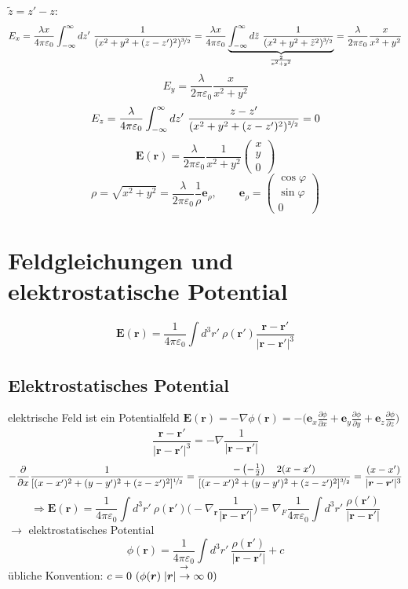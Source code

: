 \documentclass[titlepage,11pt,a4paper,ngerman]{report}
\newcommand{\prt}[2]{\frac{\partial #1}{\partial #2}}
\newcommand{\kq}{\frac{1}{4\pi\epsilon_0}}
\newcommand{\intt}[2]{\int_{#1}^{#2}}
\renewcommand{\vec}[1]{\boldsymbol{#1}}
\renewcommand{\epsilon}{\varepsilon}
\begin{document}
$\tilde{z} = z' - z$:
$$E_x = \frac{\lambda x}{4 \pi \epsilon_0}\intt{-\infty}{\infty}dz'\ \frac{1}{(x^2 + y^2 + (z-z')^2)^{\nicefrac{3}{2}}} = \frac{\lambda x}{4 \pi \epsilon_0}\underbrace{\intt{-\infty}{\infty}d\tilde{z}\ \frac{1}{(x^2 + y^2 + \tilde{z}^2)^{\nicefrac{3}{2}}}}_{\frac{2}{x^2 + y^2}} = \frac{\lambda}{2 \pi \epsilon_0} \frac{x}{x^2 + y^2}$$
$$E_y = \frac{\lambda}{2 \pi \epsilon_0}\frac{x}{x^2 + y^2}$$
$$E_z = \frac{\lambda}{4 \pi \epsilon_0} \intt{-\infty}{\infty}dz'\ \frac{z-z'}{(x^2 + y^2 + (z-z')^2)^{\nicefrac{3}{2}}} = 0$$
$$\vec{E}(\vec{r}) = \frac{\lambda}{2 \pi \epsilon_0} \frac{1}{x^2 + y^2} \begin{pmatrix}x\\ y\\ 0\end{pmatrix}$$
$$\rho = \sqrt{x^2 + y^2} = \frac{\lambda}{2 \pi \epsilon_0} \frac{1}{\rho}\vec{e}_\rho, \qquad \vec{e}_\rho = \begin{pmatrix}\cos \varphi\\ \sin \varphi\\ 0\end{pmatrix}$$

\section{Feldgleichungen und elektrostatische Potential}

$$\vec{E}(\vec{r}) = \kq \int d^3 r'\ \rho(\vec{r}') \frac{\vec{r} - \vec{r}'}{|\vec{r} - \vec{r}'|^3}$$

\subsection{Elektrostatisches Potential}

elektrische Feld ist ein Potentialfeld $\vec{E}(\vec{r}) = - \nabla\phi(\vec{r}) = - \bigg( \vec{e}_x \prt{\phi}{x} + \vec{e}_y \prt{\phi}{y} + \vec{e}_z \prt{\phi}{z}\bigg)$
$$\frac{\vec{r} - \vec{r}'}{|\vec{r} - \vec{r}'|^3} = -\nabla\frac{1}{|\vec{r}-\vec{r}'|}$$
$$-\prt{}{x} \frac{1}{[(x-x')^2 + (y-y')^2 + (z-z')^2]^{\nicefrac{1}{2}}} =  \frac{- \left(-\frac{1}{2}\right) \quad 2(x-x')}{[(x-x')^2 + (y-y')^2 + (z-z')^2]^{\nicefrac{3}{2}}} = \frac{(x-x')}{|\vec{r} - \vec{r}'|^3}$$
$$\Rightarrow \vec{E}(\vec{r}) = \kq \int d^3 r'\ \rho(\vec{r}') \bigg(-\nabla_{\vec{r}} \frac{1}{|\vec{r} - \vec{r}'|} \bigg) = \nabla_F \kq \int d^3 r'\ \frac{\rho(\vec{r}')}{|\vec{r} - \vec{r}'|}$$
$\rightarrow$ elektrostatisches Potential
$$\phi(\vec{r}) = \kq \int d^3 r'\ \frac{\rho(\vec{r}')}{|\vec{r} - \vec{r}'|} + c$$
übliche Konvention: $c = 0\ (\phi(\vec{r})\buildrel{\rightarrow}\over{|\vec{r}| \to \infty} 0)$
\end{document}
